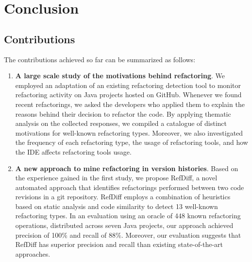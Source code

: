 
\chapter{Conclusion}
\label{ChConclusion}


\section{Contributions}
\label{SecContributions}

The contributions achieved so far can be summarized as follows:
\begin{enumerate}
\item \textbf{A large scale study of the motivations behind refactoring}.
We employed an adaptation of an existing refactoring detection tool to monitor refactoring activity on \totalProjects Java projects hosted on GitHub. Whenever we found recent refactorings, we asked the developers who applied them to explain the reasons behind their decision to refactor the code.
By applying thematic analysis on the collected responses,
we compiled a catalogue of \totalMotivationThemes distinct motivations for  well-known refactoring types.
Moreover, we also investigated the frequency of each refactoring type, the usage of refactoring tools, and how the IDE affects refactoring tools usage.

\item \textbf{A new approach to mine refactoring in version histories}.
Based on the experience gained in the first study, we propose RefDiff, a novel automated approach that identifies refactorings performed between two code revisions in a git repository. 
RefDiff employs a combination of heuristics based on static analysis and code similarity to detect 13 well-known refactoring types.
In an evaluation using an oracle of 448 known refactoring operations, distributed across seven Java projects, our approach achieved precision of 100\% and recall of 88\%.
Moreover, our evaluation suggests that RefDiff has superior precision and recall than existing state-of-the-art approaches.
\end{enumerate}